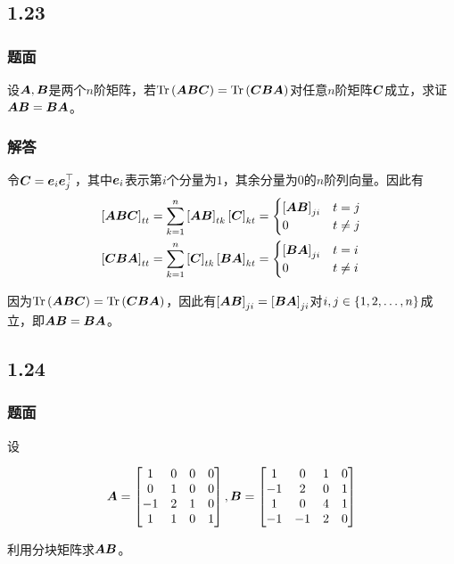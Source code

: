 \documentclass{beamer}
\begin{document}
\subsection*{1.23}

\begin{frame}
\frametitle{题面}

设\(\boldsymbol{A},\boldsymbol{B}\)是两个\(n\)阶矩阵，若\(\mathrm{Tr}\left( \boldsymbol{A}\boldsymbol{B}\boldsymbol{C} \right)=\mathrm{Tr}\left( \boldsymbol{C}\boldsymbol{B}\boldsymbol{A} \right)\)对任意\(n\)阶矩阵\(\boldsymbol{C}\)成立，求证\(\boldsymbol{A}\boldsymbol{B}=\boldsymbol{B}\boldsymbol{A}\)。

\end{frame}

\begin{frame}
\frametitle{解答}

    令\(\boldsymbol{C}=\boldsymbol{e}_i\boldsymbol{e}_j^\top\)，其中\(\boldsymbol{e}_i\)表示第\(i\)个分量为\(1\)，其余分量为\(0\)的\(n\)阶列向量。因此有
    \begin{align*}
        \left[ \boldsymbol{A}\boldsymbol{B}\boldsymbol{C} \right]_{tt} & =\sum_{k=1}^n\left[ \boldsymbol{A}\boldsymbol{B} \right]_{tk}\left[ \boldsymbol{C} \right]_{kt}=
        \begin{cases}
            \left[ \boldsymbol{A}\boldsymbol{B} \right]_{ji} & t=j     \\
            0                     & t\neq j
        \end{cases}                                                       \\
        \left[ \boldsymbol{C}\boldsymbol{B}\boldsymbol{A} \right]_{tt} & =\sum_{k=1}^n\left[ \boldsymbol{C} \right]_{tk}\left[ \boldsymbol{B}\boldsymbol{A} \right]_{kt}=
        \begin{cases}
            \left[ \boldsymbol{B}\boldsymbol{A} \right]_{ji} & t=i     \\
            0                     & t\neq i
        \end{cases}
    \end{align*}

    因为\(\mathrm{Tr}\left( \boldsymbol{A}\boldsymbol{B}\boldsymbol{C} \right)=\mathrm{Tr}\left( \boldsymbol{C}\boldsymbol{B}\boldsymbol{A} \right)\)，因此有\(\left[ \boldsymbol{A}\boldsymbol{B} \right]_{ji}=\left[ \boldsymbol{B}\boldsymbol{A} \right]_{ji}\)对\(i,j\in\left\{1,2,\dots,n \right\}\)成立，即\(\boldsymbol{A}\boldsymbol{B}=\boldsymbol{B}\boldsymbol{A}\)。

\end{frame}

\subsection*{1.24}

\begin{frame}
\frametitle{题面}

设

\begin{equation*}
    \boldsymbol{A}=\begin{bmatrix}1&0&0&0\\0&1&0&0\\-1&2&1&0\\1&1&0&1\end{bmatrix},
    \boldsymbol{B}=\begin{bmatrix}1&0&1&0\\-1&2&0&1\\1&0&4&1\\-1&-1&2&0\end{bmatrix}
\end{equation*}

利用分块矩阵求\(\boldsymbol{A}\boldsymbol{B}\)。

\end{frame}
\end{document}
